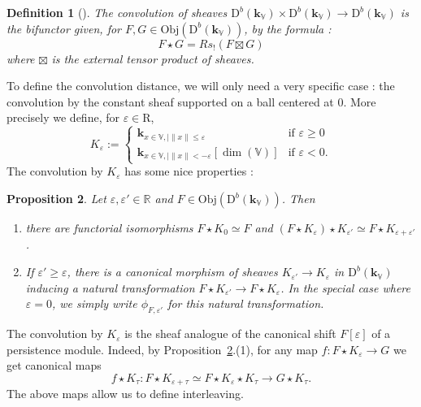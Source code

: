 \documentclass[a4paper, english, 11pt]{article}
\newcommand{\kk}[0]{\textbf{k}}
\newcommand{\0}{\vec{0}}
\newcommand{\R}[0]{\mathbb{R}}
\newcommand{\V}[0]{\mathbb{V}}
\newcommand{\D}[0]{\text{D}}
\newcommand{\Obj}[0]{\text{Obj}}
\newcommand{\Rr}[0]{\text{R}}
\newtheorem{prop}{Proposition}[section]
\newtheorem{defi}[prop]{Definition}
\begin{document}
\begin{defi}[\cite{KS18}]\label{D:Convolution} The convolution of sheaves  $\D^b(\kk_\V)\times \D^b(\kk_\V) \to \D^b(\kk_\V)$ is the bifunctor given, 
for $F,G\in \Obj(\D^b(\kk_\V))$,  by the formula : $$F\star G = R s_!(F\boxtimes G)$$ where $\boxtimes$ is the external tensor product of sheaves. 
\end{defi}
To define the convolution distance,  we will only need a very specific case : the convolution by the constant sheaf supported on a ball centered at 0. 
More precisely we define, for $\varepsilon \in \Rr$, 
\begin{equation}\label{eq:defKepsilon}
 K_\varepsilon :=  \left\{ \begin{array}{cc} 
 \kk_{x\in \V, \mid \|x\|\leq \varepsilon}  & \mbox{if } \varepsilon \geq 0 \\
 \kk_{x\in \V, \mid \|x\|< -\varepsilon}[\dim(\V)]  & \mbox{if } \varepsilon < 0 .\end{array} \right.
\end{equation}
The convolution by $K_\varepsilon$ has some nice properties : 
\begin{prop}\label{P:propertiesofconvolution} Let $\varepsilon, \varepsilon'\in \R$ and $F \in \Obj(\D^b(\kk_\V))$. Then
\begin{enumerate}
\item there are functorial isomorphisms $F\star K_0\simeq F$ and $(F\star K_{\varepsilon} )\star K_{\varepsilon'} \simeq F \star K_{\varepsilon + \varepsilon'} $.
\item If $\varepsilon' \geq \varepsilon $, there is a canonical morphism of sheaves 
$K_{\varepsilon'}\to K_{\varepsilon}$ in $\D^b(\kk_\V)$
inducing a natural transformation $F\star K_{\varepsilon'} \to F \star K_{\varepsilon} $. 
In the special case where $\varepsilon = 0$, we simply write $\phi_{F, \varepsilon'}$ for this natural transformation.
\end{enumerate}
\end{prop}
The convolution by $K_{\varepsilon}$ is the sheaf analogue of the canonical shift $F[\varepsilon]$ of a persistence module. Indeed, by
Proposition~\ref{P:propertiesofconvolution}.(1),  for any map $f: F\star K_{\varepsilon} \to G$ we get  canonical maps  
\begin{equation} \label{eq:propertiesofconvolution} f\star K_{\tau}: F\star K_{\varepsilon+\tau}\simeq F\star  K_{\varepsilon}\star K_{\tau}  \to G \star K_{\tau}.\end{equation} 
The above maps allow us to define interleaving.
\end{document}

